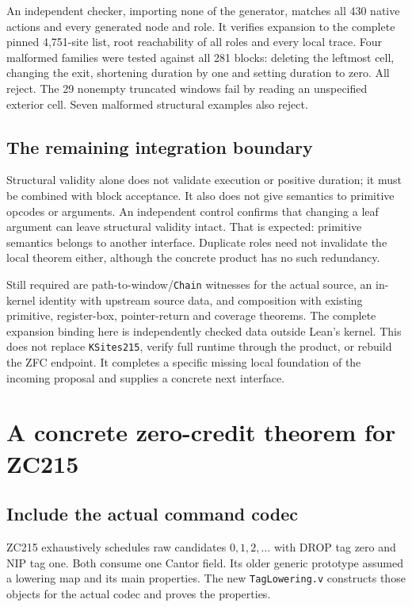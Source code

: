 \documentclass[11pt]{article}
\newcommand{\code}[1]{\texttt{\small #1}}
\begin{document}
An independent checker, importing none of the generator, matches all 430
native actions and every generated node and role. It verifies expansion to
the complete pinned 4,751-site list, root reachability of all roles and every
local trace. Four malformed families were tested against all 281 blocks:
deleting the leftmost cell, changing the exit, shortening duration by one and
setting duration to zero. All reject. The 29 nonempty truncated windows fail
by reading an unspecified exterior cell. Seven malformed structural examples
also reject.

\subsection{The remaining integration boundary}

Structural validity alone does not validate execution or positive duration;
it must be combined with block acceptance. It also does not give semantics to
primitive opcodes or arguments. An independent control confirms that changing
a leaf argument can leave structural validity intact. That is expected:
primitive semantics belongs to another interface. Duplicate roles need not
invalidate the local theorem either, although the concrete product has no
such redundancy.

Still required are path-to-window/\code{Chain} witnesses for the actual source,
an in-kernel identity with upstream source data, and composition with existing
primitive, register-box, pointer-return and coverage theorems. The complete
expansion binding here is independently checked data outside Lean's kernel.
This does not replace \code{KSites215}, verify full runtime through the product,
or rebuild the ZFC endpoint. It completes a specific missing local foundation
of the incoming proposal and supplies a concrete next interface.

\section{A concrete zero-credit theorem for ZC215}

\subsection{Include the actual command codec}

ZC215 exhaustively schedules raw candidates $0,1,2,\ldots$ with DROP tag zero
and NIP tag one. Both consume one Cantor field. Its older generic prototype
assumed a lowering map and its main properties. The new \code{TagLowering.v}
constructs those objects for the actual codec and proves the properties.
\end{document}
